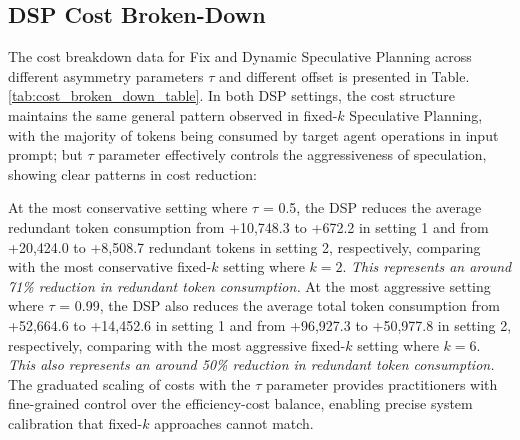 \subsection{DSP Cost Broken-Down} 
The cost breakdown data for Fix and Dynamic Speculative Planning across different asymmetry parameters $\tau$ and different offset is presented in Table.\ref{tab:cost_broken_down_table}. In both DSP settings, the cost structure maintains the same general pattern observed in fixed-$k$ Speculative Planning, with the majority of tokens being consumed by target agent operations in input prompt; but $\tau$ parameter effectively controls the aggressiveness of speculation, showing clear patterns in cost reduction:

At the most conservative setting where $\tau$ = 0.5, the DSP reduces the average redundant token consumption from +10,748.3 to +672.2 in setting 1 and from +20,424.0 to +8,508.7 redundant tokens in setting 2, respectively, comparing with the most conservative fixed-$k$ setting where $k=2$. \textit{This represents an around 71\% reduction in redundant token consumption.} At the most aggressive setting where $\tau$ = 0.99, the DSP also reduces the average total token consumption from +52,664.6 to +14,452.6 in setting 1 and from +96,927.3 to +50,977.8 in setting 2, respectively, comparing with the most aggressive fixed-$k$ setting where $k=6$. \textit{This also represents an around 50\% reduction in redundant token consumption.} The graduated scaling of costs with the $\tau$ parameter provides practitioners with fine-grained control over the efficiency-cost balance, enabling precise system calibration that fixed-$k$ approaches cannot match.


